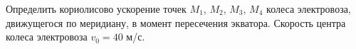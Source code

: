 Определить кориолисово ускорение точек $M_1$, $M_2$, $M_3$, $M_4$ колеса
электровоза, движущегося по меридиану, в момент пересечения экватора. 
Скорость центра колеса электровоза $v_0=40$ м/с.
